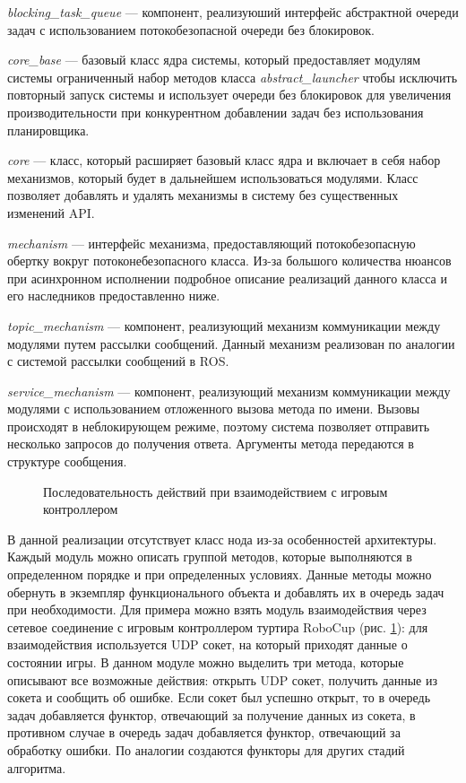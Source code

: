 \textit{blocking\_task\_queue} --- компонент, реализуюший интерфейс абстрактной очереди задач с использованием потокобезопасной очереди без блокировок.

\textit{core\_base} --- базовый класс ядра системы, который предоставляет модулям системы ограниченный набор методов класса \textit{abstract\_launcher} чтобы исключить повторный запуск системы и использует очереди без блокировок для увеличения производительности при конкурентном добавлении задач без использования планировщика.

\textit{core} --- класс, который расширяет базовый класс ядра и включает в себя набор механизмов, который будет в дальнейшем использоваться модулями. Класс позволяет добавлять и удалять механизмы в систему без существенных изменений API.

\textit{mechanism} --- интерфейс механизма, предоставляющий потокобезопасную обертку вокруг потоконебезопасного класса. Из-за большого количества нюансов при асинхронном исполнении подробное описание реализаций данного класса и его наследников предоставленно ниже.

\textit{topic\_mechanism} --- компонент, реализующий механизм коммуникации между модулями путем рассылки сообщений. Данный механизм реализован по аналогии с системой рассылки сообщений в ROS.

\textit{service\_mechanism} --- компонент, реализующий механизм коммуникации между модулями с использованием отложенного вызова метода по имени. Вызовы происходят в неблокирующем режиме, поэтому система позволяет отправить несколько запросов до получения ответа. Аргументы метода передаются в структуре сообщения.

\begin{figure}[h]
    \centering{\texttt{[image: 2\_3\_2\_gc]}}
    \caption{Последовательность действий при взаимодействием с игровым контроллером}
    \label{im:2_3_2_gc}
\end{figure}

В данной реализации отсутствует класс нода из-за особенностей архитектуры. Каждый модуль можно описать группой методов, которые выполняются в определенном порядке и при определенных условиях. Данные методы можно обернуть в экземпляр функционального объекта и добавлять их в очередь задач при необходимости. Для примера можно взять модуль взаимодействия через сетевое соединение с игровым контроллером туртира RoboCup (рис. \ref{im:2_3_2_gc}): для взаимодействия используется UDP сокет, на который приходят данные о состоянии игры. В данном модуле можно выделить три метода, которые описывают все возможные действия: открыть UDP сокет, получить данные из сокета и сообщить об ошибке. Если сокет был успешно открыт, то в очередь задач добавляется функтор, отвечающий за получение данных из сокета, в противном случае в очередь задач добавляется функтор, отвечающий за обработку ошибки. По аналогии создаются функторы для других стадий алгоритма.

